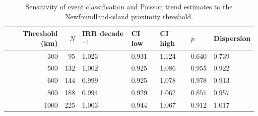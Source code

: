 \begin{table}[htbp]
\caption{Sensitivity of event classification and Poisson trend estimates to the Newfoundland-island proximity threshold.}
\label{tab:threshold_sensitivity}
\begin{tabular}{rrlllll}
\toprule
Threshold (km) & $N$ & IRR decade$^{-1}$ & CI low & CI high & $p$ & Dispersion \\
\midrule
300 & 95 & 1.023 & 0.931 & 1.124 & 0.640 & 0.739 \\
500 & 132 & 1.002 & 0.925 & 1.086 & 0.955 & 0.922 \\
600 & 144 & 0.999 & 0.925 & 1.078 & 0.978 & 0.913 \\
800 & 188 & 0.994 & 0.929 & 1.062 & 0.851 & 0.957 \\
1000 & 225 & 1.003 & 0.944 & 1.067 & 0.912 & 1.017 \\
\bottomrule
\end{tabular}
\end{table}
